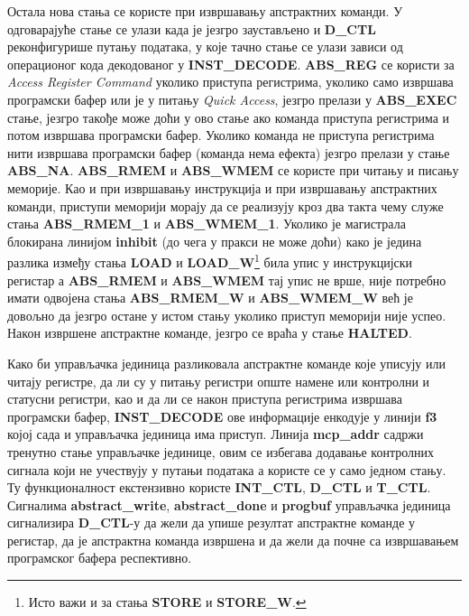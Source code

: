Остала нова стања се користе при извршавању апстрактних команди. У одговарајуће стање се улази када је језгро заустављено и \textbf{D\_CTL}
реконфигурише путању података, у које тачно стање се улази зависи од операционог кода декодованог у \textbf{INST\_DECODE}. \textbf{ABS\_REG} се користи за \textit{Access Register Command} уколико приступа регистрима, уколико само извршава програмски бафер или је у питању \textit{Quick Access}, језгро прелази у \textbf{ABS\_EXEC} стање, језгро такође може доћи у ово стање ако команда приступа регистрима и потом извршава програмски бафер. Уколико команда не приступа регистрима нити извршава програмски бафер (команда нема ефекта) језгро прелази у стање \textbf{ABS\_NA}. \textbf{ABS\_RMEM} и \textbf{ABS\_WMEM} се користе при читању и писању меморије. Као и при извршавању инструкција и при извршавању апстрактних команди, приступи меморији морају да се реализују кроз два такта чему служе стања \textbf{ABS\_RMEM\_1} и \textbf{ABS\_WMEM\_1}. Уколико је магистрала блокирана линијом \textbf{inhibit} (до чега у пракси не може доћи) како је једина разлика између стања \textbf{LOAD} и \textbf{LOAD\_W}\footnote{Исто важи и за стања \textbf{STORE} и \textbf{STORE\_W}.} била упис у инструкцијски регистар а \textbf{ABS\_RMEM} и \textbf{ABS\_WMEM} тај упис не врше, није потребно имати одвојена стања \textbf{ABS\_RMEM\_W} и \textbf{ABS\_WMEM\_W} већ је довољно да језгро остане у истом стању уколико приступ меморији није успео. Након извршене апстрактне команде, језгро се враћа у стање \textbf{HALTED}.\newpage

Како би управљачка јединица разликовала апстрактне команде које уписују или читају регистре, да ли су у питању регистри опште намене или контролни и статусни регистри, као и да ли се након приступа регистрима извршава програмски бафер, \textbf{INST\_DECODE} ове информације енкодује у линији \textbf{f3} којој сада и управљачка јединица има приступ. Линија \textbf{mcp\_addr} садржи тренутно стање управљачке јединице, овим се избегава додавање контролних сигнала који не учествују у путањи података а користе се у само једном стању. Ту функционалност екстензивно користе \textbf{INT\_CTL}, \textbf{D\_CTL} и \textbf{T\_CTL}. Сигналима \textbf{abstract\_write}, \textbf{abstract\_done} и \textbf{progbuf} управљачка јединица сигнализира \textbf{D\_CTL}-у да жели да упише резултат апстрактне команде у регистар, да је апстрактна команда извршена и да жели да почне са извршавањем програмског бафера респективно.



